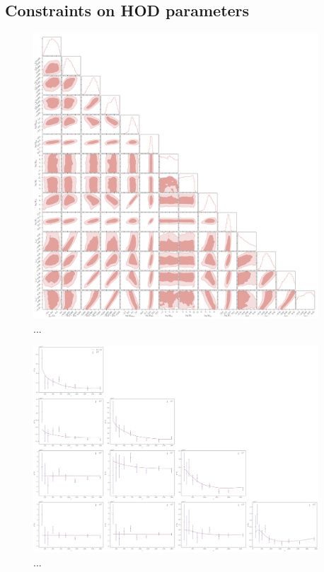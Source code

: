 \documentclass[a4paper,11pt]{article}
\begin{document}
\subsection{Constraints on HOD parameters}
  
\begin{figure}
\begin{center}
\includegraphics[width=0.95\textwidth]{figures/contours_mPk=HOD_fix=alpha-fc-sigmaM_HOD=zevol_fit=pz-shifts+prior=0p2-pz-widths+prior=0p2_fit=auto+cross_cosmo=const_cov=G+NG+SSC-LINBIAS_HOD-param=zfid_clfit=HOD-zevol.pdf}
\caption{...}
\label{fig:constraints-fid}
\end{center}
\end{figure}

\begin{figure}
\begin{center}
\includegraphics[width=0.95\textwidth]{figures/Cls-data-vs-best-fit_mPk=HOD_fix=alpha-fc-sigmaM_HOD=zevol_fit=pz-shifts+prior=0p2_fit=auto+cross_cosmo=const_cov=G+NG+SSC-LINBIAS_HOD-param=zfid_clfit=HOD-zevol.pdf}
\caption{...}
\label{fig:cls-best-fit}
\end{center}
\end{figure}
\end{document}
